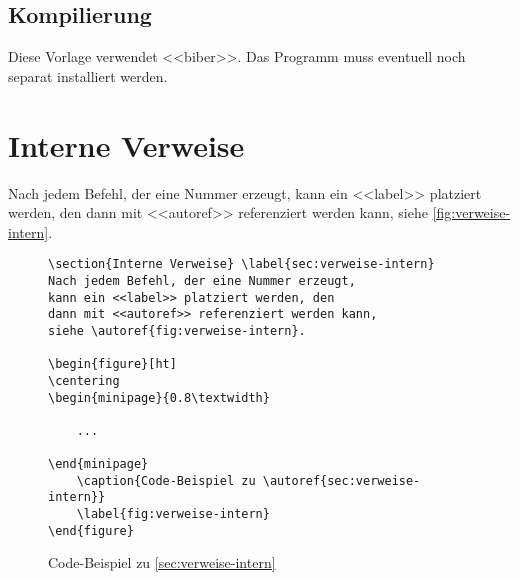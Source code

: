 \subsection{Kompilierung}
Diese Vorlage verwendet <<biber>>\cite{bibtex-with-biber}. Das Programm muss
eventuell noch separat installiert werden.

\newpage
\section{Interne Verweise} \label{sec:verweise-intern}
Nach jedem Befehl, der eine Nummer erzeugt, 
kann ein <<label>> platziert werden, den 
dann mit <<autoref>> referenziert werden kann, 
siehe \autoref{fig:verweise-intern}.


\begin{figure}[ht]
\centering
\begin{minipage}{0.8\textwidth}
\begin{verbatim}
\section{Interne Verweise} \label{sec:verweise-intern}
Nach jedem Befehl, der eine Nummer erzeugt, 
kann ein <<label>> platziert werden, den 
dann mit <<autoref>> referenziert werden kann, 
siehe \autoref{fig:verweise-intern}.

\begin{figure}[ht]
\centering
\begin{minipage}{0.8\textwidth}

	...

\end{minipage}
	\caption{Code-Beispiel zu \autoref{sec:verweise-intern}}
	\label{fig:verweise-intern}
\end{figure}
\end{verbatim}
\end{minipage}
	\caption{Code-Beispiel zu \autoref{sec:verweise-intern}}
	\label{fig:verweise-intern}
\end{figure}



